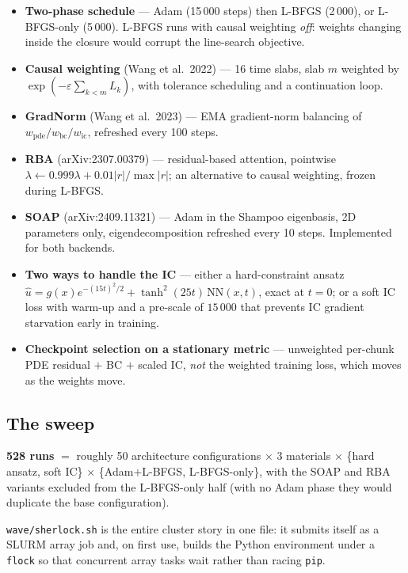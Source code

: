 \documentclass[11pt,a4paper]{article}
\begin{document}
\begin{itemize}[leftmargin=*,itemsep=3pt]
\item \textbf{Two-phase schedule} --- Adam (15\,000 steps) then L-BFGS (2\,000),
or L-BFGS-only (5\,000). L-BFGS runs with causal weighting \emph{off}: weights
changing inside the closure would corrupt the line-search objective.
\item \textbf{Causal weighting} (Wang et al.\ 2022) --- 16 time slabs, slab $m$
weighted by $\exp(-\varepsilon\sum_{k<m}L_k)$, with tolerance scheduling and a
continuation loop.
\item \textbf{GradNorm} (Wang et al.\ 2023) --- EMA gradient-norm balancing of
$w_\mathrm{pde}/w_\mathrm{bc}/w_\mathrm{ic}$, refreshed every 100 steps.
\item \textbf{RBA} (arXiv:2307.00379) --- residual-based attention, pointwise
$\lambda \leftarrow 0.999\lambda + 0.01|r|/\max|r|$; an alternative to causal
weighting, frozen during L-BFGS.
\item \textbf{SOAP} (arXiv:2409.11321) --- Adam in the Shampoo eigenbasis, 2D
parameters only, eigendecomposition refreshed every 10 steps. Implemented for
both backends.
\item \textbf{Two ways to handle the IC} --- either a hard-constraint ansatz
$\hat u = g(x)e^{-(15t)^2/2} + \tanh^2(25t)\,\mathrm{NN}(x,t)$, exact at $t=0$;
or a soft IC loss with warm-up and a pre-scale of $15\,000$ that prevents IC
gradient starvation early in training.
\item \textbf{Checkpoint selection on a stationary metric} --- unweighted
per-chunk PDE residual $+$ BC $+$ scaled IC, \emph{not} the weighted training
loss, which moves as the weights move.
\end{itemize}

\subsection{The sweep}

\textbf{528 runs} $=$ roughly 50 architecture configurations $\times$ 3
materials $\times$ \{hard ansatz, soft IC\} $\times$ \{Adam$+$L-BFGS,
L-BFGS-only\}, with the SOAP and RBA variants excluded from the L-BFGS-only half
(with no Adam phase they would duplicate the base configuration).

\texttt{wave/sherlock.sh} is the entire cluster story in one file: it submits
itself as a SLURM array job and, on first use, builds the Python environment
under a \texttt{flock} so that concurrent array tasks wait rather than racing
\texttt{pip}.
\end{document}
